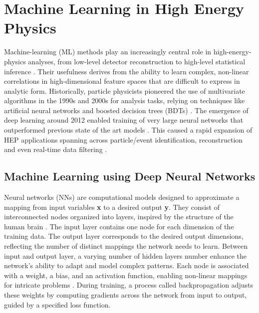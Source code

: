 \chapter{Machine Learning in High Energy Physics}

Machine-learning (ML) methods play an increasingly central role in high-energy-physics analyses, from low-level detector reconstruction to high-level statistical inference \cite{PhysRevD.112.016004}. Their usefulness derives from the ability to learn complex, non-linear correlations in high-dimensional feature spaces that are difficult to express in analytic form. Historically, particle physicists pioneered the use of multivariate algorithms in the 1990s and 2000s for analysis tasks, relying on techniques like artificial neural networks and boosted decision trees (BDTs) \cite{Guest_2018}. The emergence of deep learning around 2012 enabled training of very large neural networks that outperformed previous state of the art models \cite{Guest_2018}. This caused a rapid expansion of HEP applications spanning across particle/event identification, reconstruction and even real-time data filtering \cite{albertsson2019machinelearninghighenergy}.


\section{Machine Learning using Deep Neural Networks}

Neural networks (NNs) are computational models designed to approximate a mapping from input variables \textbf{x} to a desired output \textbf{y}. They consist of interconnected nodes organized into layers, inspired by the structure of the human brain \cite{hammad2024artificialneuralnetworkdeep}. The input layer contains one node for each dimension of the training data. The output layer corresponds to the desired output dimensions, reflecting the number of distinct mappings the network needs to learn. Between input and output layer, a varying number of hidden layers number enhance the network’s ability to adapt and model complex patterns. Each node is associated with a weight, a bias, and an activation function, enabling non-linear mappings for intricate problems \cite{Goodfellow-et-al-2016}. During training, a process called backpropagation adjusts these weights by computing gradients across the network from input to output, guided by a specified loss function.

